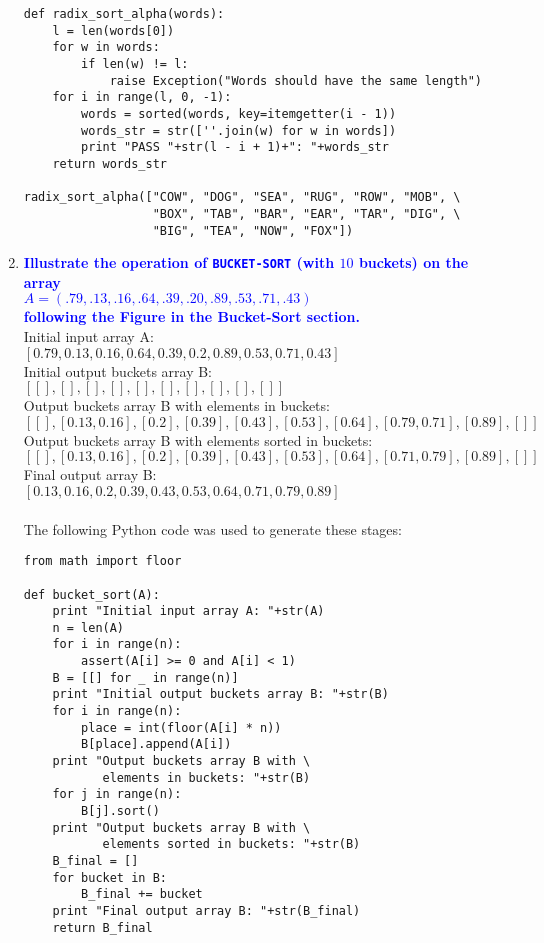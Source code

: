 \documentclass{article}
\begin{document}
\begin{enumerate}
\begin{verbatim}
def radix_sort_alpha(words):
    l = len(words[0])
    for w in words:
        if len(w) != l:
            raise Exception("Words should have the same length")
    for i in range(l, 0, -1):
        words = sorted(words, key=itemgetter(i - 1))
        words_str = str([''.join(w) for w in words])
        print "PASS "+str(l - i + 1)+": "+words_str
    return words_str
        
radix_sort_alpha(["COW", "DOG", "SEA", "RUG", "ROW", "MOB", \
                  "BOX", "TAB", "BAR", "EAR", "TAR", "DIG", \
                  "BIG", "TEA", "NOW", "FOX"])
    \end{verbatim}

\item \textbf{\textcolor{blue}{Illustrate the operation of {\tt BUCKET-SORT} (with $10$ buckets) on the array \\ $A=(.79,.13,.16,.64,.39,.20,.89,.53,.71,.43)$ \\  following the Figure in the Bucket-Sort section.}}
    \\ Initial input array A: 
    \\ $[0.79, 0.13, 0.16, 0.64, 0.39, 0.2, 0.89, 0.53, 0.71, 0.43]$
    \\ Initial output buckets array B:
    \\ $[[], [], [], [], [], [], [], [], [], []]$
    \\ Output buckets array B with elements in buckets:
    \\ $[[], [0.13, 0.16], [0.2], [0.39], [0.43], [0.53], [0.64], [0.79, 0.71], [0.89], []]$
    \\ Output buckets array B with elements sorted in buckets:
    \\ $[[], [0.13, 0.16], [0.2], [0.39], [0.43], [0.53], [0.64], [0.71, 0.79], [0.89], []]$
    \\ Final output array B:
    \\ $[0.13, 0.16, 0.2, 0.39, 0.43, 0.53, 0.64, 0.71, 0.79, 0.89]$
    \\\\ The following Python code was used to generate these stages:
    \begin{verbatim}
from math import floor
             
def bucket_sort(A):
    print "Initial input array A: "+str(A)
    n = len(A)
    for i in range(n):
        assert(A[i] >= 0 and A[i] < 1)
    B = [[] for _ in range(n)]
    print "Initial output buckets array B: "+str(B)
    for i in range(n):
        place = int(floor(A[i] * n))
        B[place].append(A[i])
    print "Output buckets array B with \
           elements in buckets: "+str(B)
    for j in range(n):
        B[j].sort()
    print "Output buckets array B with \
           elements sorted in buckets: "+str(B)
    B_final = []
    for bucket in B:
        B_final += bucket
    print "Final output array B: "+str(B_final)
    return B_final
    

\end{verbatim}
\end{enumerate}
\end{document}
